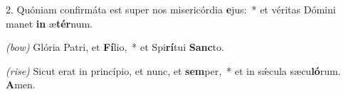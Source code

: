 2. Quóniam confirmáta est super nos misericórdia \textbf{e}jus:~* et véritas Dómini manet \textbf{in} æ\textbf{tér}num.

\textit{(bow)} Glória Patri, et \textbf{Fí}lio,~* et Spi\textbf{rí}tui \textbf{Sanc}to.

\textit{(rise)} Sicut erat in princípio, et nunc, et \textbf{sem}per,~* et in sǽcula sæcu\textbf{ló}rum. \textbf{A}men.